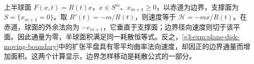 \begin{example}\label{g3:exm:mcf-free-boundary-flux}
	上半球面 \(F(x,t)=R(t)x\)，\(x\in S^m\)、\(x_{m+1}\ge0\)，以赤道为边界，支撑面为 \(S=\{x_{m+1}=0\}\)。取 \(R'(t)=-m/R(t)\)，则速度等于 \(\mathcal H=-mx/R(t)\)。在赤道，球面的外余法向为 \(-e_{m+1}\)，它垂直于支撑面；边界径向速度则切于该平面。因此通量为零，半球面积满足同一耗散恒等式。反之，\cref{g3:exm:plane-disk-moving-boundary}中的扩张平盘具有零平均曲率法向速度，却因正的边界通量而增加面积。这两个计算显示，边界怎样移动是耗散公式的一部分。
\end{example}
